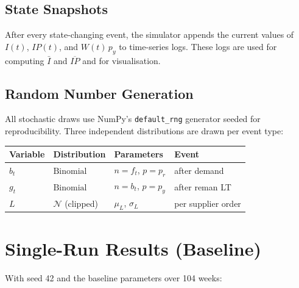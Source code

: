 \documentclass[11pt]{article}
\begin{document}
\subsection{State Snapshots}

After every state-changing event, the simulator appends the current values of
$I(t)$, $IP(t)$, and $W(t)\,p_y$ to time-series logs.  These logs are used
for computing $\bar{I}$ and $\overline{IP}$ and for visualisation.

\subsection{Random Number Generation}

All stochastic draws use NumPy's \texttt{default\_rng} generator seeded for
reproducibility.  Three independent distributions are drawn per event type:

\begin{center}
\begin{tabular}{llll}
\toprule
Variable & Distribution & Parameters & Event \\
\midrule
$b_t$ & $\mathrm{Binomial}$ & $n = f_t$, $p = p_r$ & after demand \\
$g_t$ & $\mathrm{Binomial}$ & $n = b_t$, $p = p_y$ & after reman LT \\
$L$   & $\mathcal{N}$ (clipped) & $\mu_L$, $\sigma_L$ & per supplier order \\
\bottomrule
\end{tabular}
\end{center}

\section{Single-Run Results (Baseline)}

With seed 42 and the baseline parameters over 104 weeks:
\end{document}
